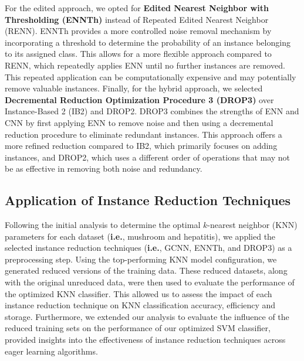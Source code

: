 For the edited approach, we opted for \textbf{Edited Nearest Neighbor with Thresholding (ENNTh)} \cite{wilson1972asymptotic}
instead of Repeated Edited Nearest Neighbor (RENN). ENNTh provides a more controlled noise removal mechanism by
incorporating a threshold to determine the probability of an instance belonging to its assigned class. 
This allows for a more flexible approach compared to RENN, which repeatedly applies ENN until no further 
instances are removed. This repeated application can be computationally expensive and may potentially 
remove valuable instances. Finally, for the hybrid approach, we selected 
\textbf{Decremental Reduction Optimization Procedure 3 (DROP3)} \cite{wilson2000reduction}
over Instance-Based 2 (IB2) and DROP2. DROP3 combines the strengths of ENN and CNN by first applying 
ENN to remove noise and then using a decremental reduction procedure to eliminate redundant instances.
This approach offers a more refined reduction compared to IB2, which primarily focuses on adding instances,
and DROP2, which uses a different order of operations that may not be as effective in removing both noise and
redundancy.


\subsection*{Application of Instance Reduction Techniques}

Following the initial analysis to determine the optimal $k$-nearest neighbor (KNN)
parameters for each dataset (\textbf{i.e.}, mushroom and hepatitis), we applied the selected instance reduction techniques
(\textbf{i.e.}, GCNN, ENNTh, and DROP3) as a preprocessing step. Using the top-performing KNN model configuration,
we generated reduced versions of the training data. These reduced datasets, along with the original
unreduced data, were then used to evaluate the performance of the optimized KNN classifier. 
This allowed us to assess the impact of each instance reduction technique on KNN classification 
accuracy, efficiency and storage. Furthermore, we extended our analysis to evaluate the influence of the reduced training sets
on the performance of our optimized SVM classifier, provided insights into the effectiveness of instance reduction techniques across eager learning algorithms.


